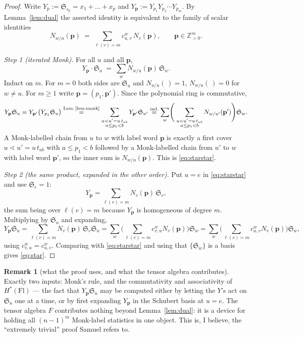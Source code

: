 \documentclass[11pt]{article}
\theoremstyle{plain}
\theoremstyle{definition}
\newtheorem{remark}[theorem]{Remark}
\newcommand{\Sch}{\mathfrak{S}}
\newcommand{\Fl}{\mathrm{Fl}}
\DeclareMathOperator{\len}{\ell}
\begin{document}
\begin{proof}
Write $Y_{p}:=\Sch_{s_{p}}=x_{1}+\dots+x_{p}$ and
$Y_{\mathbf{p}}:=Y_{p_{1}}Y_{p_{2}}\cdots Y_{p_{m}}$. By Lemma~\ref{lem:dual}
the asserted identity is equivalent to the family of scalar identities
\begin{equation}
  N_{w/u}(\mathbf{p})\;=\;\sum_{\len(v)=m}c_{u,v}^{w}\,N_{v}(\mathbf{p}),
  \qquad \mathbf{p}\in\mathbb{Z}_{>0}^{m}.
  \tag{$*$}\label{eq:star}
\end{equation}

\emph{Step 1 (iterated Monk).} For all $u$ and all $\mathbf{p}$,
\begin{equation}
  Y_{\mathbf{p}}\cdot\Sch_{u}\;=\;\sum_{w}N_{w/u}(\mathbf{p})\,\Sch_{w}.
  \tag{$**$}\label{eq:starstar}
\end{equation}
Induct on $m$. For $m=0$ both sides are $\Sch_{u}$ and
$N_{u/u}(\,)=1$, $N_{w/u}(\,)=0$ for $w\ne u$. For $m\ge1$ write
$\mathbf{p}=(p_{1},\mathbf{p}')$. Since the polynomial ring is commutative,
\[
  Y_{\mathbf{p}}\Sch_{u}
  = Y_{\mathbf{p}'}\bigl(Y_{p_{1}}\Sch_{u}\bigr)
  \overset{\text{Lem.\,\ref{lem:monk}}}{=}
  \sum_{\substack{u\lessdot u'=u\,t_{ab}\\ a\le p_{1}<b}} Y_{\mathbf{p}'}\Sch_{u'}
  \overset{\text{ind.}}{=}
  \sum_{w}\Biggl(\;\sum_{\substack{u\lessdot u'=u\,t_{ab}\\ a\le p_{1}<b}}
       N_{w/u'}(\mathbf{p}')\Biggr)\Sch_{w}.
\]
A Monk-labelled chain from $u$ to $w$ with label word $\mathbf{p}$ is exactly a
first cover $u\lessdot u'=u\,t_{ab}$ with $a\le p_{1}<b$ followed by a
Monk-labelled chain from $u'$ to $w$ with label word $\mathbf{p}'$, so the inner
sum is $N_{w/u}(\mathbf{p})$. This is \eqref{eq:starstar}.

\emph{Step 2 (the same product, expanded in the other order).} Put $u=e$ in
\eqref{eq:starstar} and use $\Sch_{e}=1$:
\[
  Y_{\mathbf{p}}=\sum_{\len(v)=m}N_{v}(\mathbf{p})\,\Sch_{v},
\]
the sum being over $\len(v)=m$ because $Y_{\mathbf{p}}$ is homogeneous of
degree $m$. Multiplying by $\Sch_{u}$ and expanding,
\[
  Y_{\mathbf{p}}\Sch_{u}
  =\sum_{\len(v)=m}N_{v}(\mathbf{p})\,\Sch_{v}\Sch_{u}
  =\sum_{w}\Biggl(\sum_{\len(v)=m}c^{w}_{v,u}N_{v}(\mathbf{p})\Biggr)\Sch_{w}
  =\sum_{w}\Biggl(\sum_{\len(v)=m}c^{w}_{u,v}N_{v}(\mathbf{p})\Biggr)\Sch_{w},
\]
using $c^{w}_{v,u}=c^{w}_{u,v}$. Comparing with \eqref{eq:starstar} and using
that $\{\Sch_{w}\}$ is a basis gives \eqref{eq:star}.
\end{proof}

\begin{remark}[what the proof uses, and what the tensor algebra contributes]
Exactly two inputs: Monk's rule, and the commutativity and associativity of
$H^{*}(\Fl)$ --- the fact that $Y_{\mathbf{p}}\Sch_{u}$ may be computed either
by letting the $Y$'s act on $\Sch_{u}$ one at a time, or by first expanding
$Y_{\mathbf{p}}$ in the Schubert basis at $u=e$. The tensor algebra $F$
contributes nothing beyond Lemma~\ref{lem:dual}: it is a device for holding all
$(n-1)^{m}$ Monk-label statistics in one object. This is, I believe, the
``extremely trivial'' proof Samuel refers to.
\end{remark}
\end{document}
